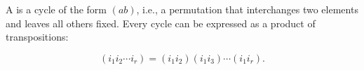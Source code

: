 A  is a cycle of the form $(ab)$, i.e., a permutation that interchanges two elements and leaves all others fixed. Every cycle can be expressed as a product of transpositions:

$$(i_1 i_2 \cdots i_r) = (i_1 i_2)(i_1 i_3) \cdots (i_1 i_r).$$
